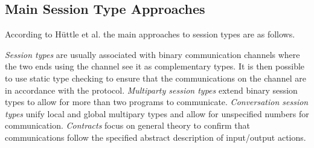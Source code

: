 \subsection{Main Session Type Approaches}
According to H\"{u}ttle et al. \cite{foundBTypes} the main approaches to session types are as follows.

\textit{Session types} are usually associated with binary communication channels where the two ends using the channel see it as complementary types. It is then possible to use static type checking to ensure that the communications on the channel are in accordance with the protocol. \textit{Multiparty session types} extend binary session types to allow for more than two programs to communicate. \textit{Conversation session types} unify local and global multipary types and allow for unspecified numbers for communication. \textit{Contracts} focus on general theory to confirm that communications follow the specified abstract description of input/output actions.

